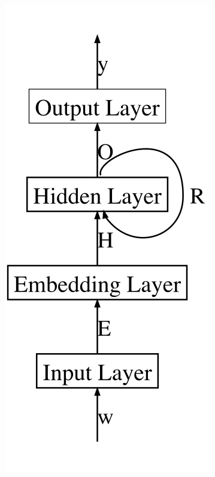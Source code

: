 \documentclass[12pt,a4paper,times,twoside,openright]{report}
\begin{document}
\begin{figure}[ht!]
    \begin{minipage}{0.325\linewidth}
    \centering
    \includegraphics[scale=0.4]{images/NN/LD-RNN/ElmanRNN_inkscape}
    \end{minipage}
    \begin{minipage}{0.325\linewidth}
    \centering

\end{minipage}
\end{figure}
\end{document}
